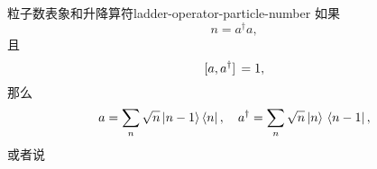 \begin{back}{粒子数表象和升降算符}{ladder-operator-particle-number}
    如果
    \begin{equation}
        n = a^\dagger a,
    \end{equation}
    且
    \begin{equation}
        \comm*{a}{a^\dagger} = 1,
    \end{equation}
    那么
    \begin{equation}
        a = \sum_{n} \sqrt{n} \ket*{n-1} \bra{n}, \quad a^\dagger = \sum_{n} \sqrt{n} \ket*{n} \bra*{n-1},
    \end{equation}
    或者说
\end{back}